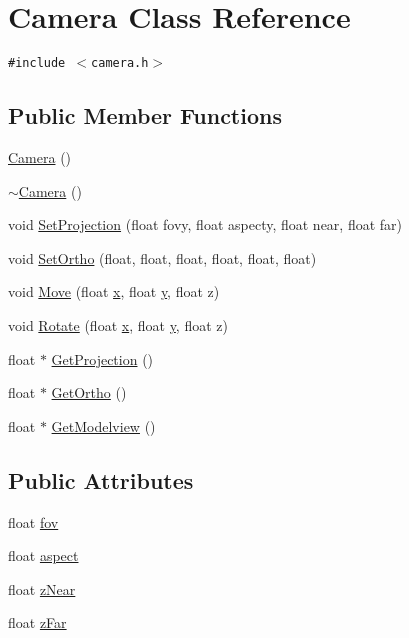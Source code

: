 \hypertarget{class_camera}{
\section{Camera Class Reference}
\label{class_camera}
}
{\tt \#include $<$camera.h$>$}

\subsection*{Public Member Functions}
\begin{CompactItemize}
\item 
\hyperlink{class_camera_01f94c3543f56ede7af49dc778f19331}{Camera} ()
\item 
\hyperlink{class_camera_d1897942d0ccf91052386388a497349f}{$\sim$Camera} ()
\item 
void \hyperlink{class_camera_61958f307ad537f208531b9926fd2353}{SetProjection} (float fovy, float aspecty, float near, float far)
\item 
void \hyperlink{class_camera_390dde06b427b5bca332dec8bf3ec96f}{SetOrtho} (float, float, float, float, float, float)
\item 
void \hyperlink{class_camera_6bab9bc5cb0e297bbe9b15c260426569}{Move} (float \hyperlink{mouse_8cpp_6150e0515f7202e2fb518f7206ed97dc}{x}, float \hyperlink{mouse_8cpp_0a2f84ed7838f07779ae24c5a9086d33}{y}, float z)
\item 
void \hyperlink{class_camera_614035aa2108e212946092789cb487ce}{Rotate} (float \hyperlink{mouse_8cpp_6150e0515f7202e2fb518f7206ed97dc}{x}, float \hyperlink{mouse_8cpp_0a2f84ed7838f07779ae24c5a9086d33}{y}, float z)
\item 
float $\ast$ \hyperlink{class_camera_76150532e30d85a51c8abd28cde37628}{GetProjection} ()
\item 
float $\ast$ \hyperlink{class_camera_0e9143e16c94bdecf0ca5935a8fe44e7}{GetOrtho} ()
\item 
float $\ast$ \hyperlink{class_camera_e9be306be54cbdaf385df04e25955ae7}{GetModelview} ()
\end{CompactItemize}
\subsection*{Public Attributes}
\begin{CompactItemize}
\item 
float \hyperlink{class_camera_ff7393c9cfbccd7e369091f00008da93}{fov}
\item 
float \hyperlink{class_camera_181aff3db1ae87a837ddc3a97e5b0f43}{aspect}
\item 
float \hyperlink{class_camera_1db2166635ff27594eda3a23130b66ac}{zNear}
\item 
float \hyperlink{class_camera_6290469f972a5903c805725db563f41f}{zFar}
\end{CompactItemize}


